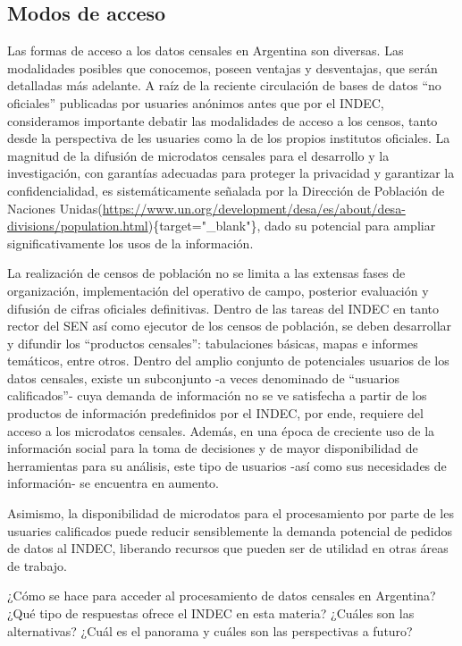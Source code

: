 \documentclass[
]{book}
\begin{document}
\hypertarget{modos-de-acceso}{%
\subsection{Modos de acceso}\label{modos-de-acceso}}

Las formas de acceso a los datos censales en Argentina son diversas. Las modalidades posibles que conocemos, poseen ventajas y desventajas, que serán detalladas más adelante. A raíz de la reciente circulación de bases de datos ``no oficiales'' publicadas por usuaries anónimos antes que por el INDEC, consideramos importante debatir las modalidades de acceso a los censos, tanto desde la perspectiva de les usuaries como la de los propios institutos oficiales. La magnitud de la difusión de microdatos censales para el desarrollo y la investigación, con garantías adecuadas para proteger la privacidad y garantizar la confidencialidad, es sistemáticamente señalada por la Dirección de Población de Naciones Unidas(\url{https://www.un.org/development/desa/es/about/desa-divisions/population.html})\{target="\_blank"\}, dado su potencial para ampliar significativamente los usos de la información.

La realización de censos de población no se limita a las extensas fases de organización, implementación del operativo de campo, posterior evaluación y difusión de cifras oficiales definitivas. Dentro de las tareas del INDEC en tanto rector del SEN así como ejecutor de los censos de población, se deben desarrollar y difundir los ``productos censales'': tabulaciones básicas, mapas e informes temáticos, entre otros. Dentro del amplio conjunto de potenciales usuarios de los datos censales, existe un subconjunto -a veces denominado de ``usuarios calificados''- cuya demanda de información no se ve satisfecha a partir de los productos de información predefinidos por el INDEC, por ende, requiere del acceso a los microdatos censales. Además, en una época de creciente uso de la información social para la toma de decisiones y de mayor disponibilidad de herramientas para su análisis, este tipo de usuarios -así como sus necesidades de información- se encuentra en aumento.

Asimismo, la disponibilidad de microdatos para el procesamiento por parte de les usuaries calificados puede reducir sensiblemente la demanda potencial de pedidos de datos al INDEC, liberando recursos que pueden ser de utilidad en otras áreas de trabajo.

¿Cómo se hace para acceder al procesamiento de datos censales en Argentina? ¿Qué tipo de respuestas ofrece el INDEC en esta materia? ¿Cuáles son las alternativas? ¿Cuál es el panorama y cuáles son las perspectivas a futuro?
\end{document}
